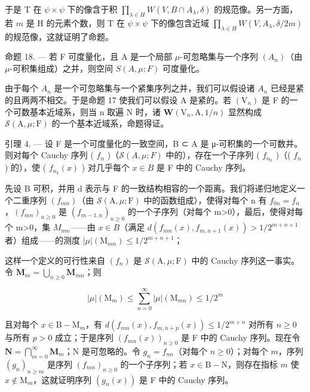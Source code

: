 于是 T 在 \(\psi \times \psi\) 下的像含于积 \(\prod_{\lambda \in H} W(V, B \cap A_{\lambda}, \delta)\) 的规范像。另一方面，若 \(m\) 是 H 的元素个数，则 T 在 \(\psi \times \psi\) 下的像包含近域 \(\prod_{\lambda \in H} W(V, A_{\lambda}, \delta / 2m)\) 的规范像，这就证明了命题。

命题 18. --- 若 F 可度量化，且 A 是一个局部 \(\mu\)-可忽略集与一个序列 \((A_{n})\)（由 \(\mu\)-可积集组成）之并，则空间 \(S(A,\mu;F)\) 可度量化。

由于每个 \(A_{n}\) 是一个可忽略集与一个紧集序列之并，我们可以假设诸 \(A_{n}\) 已经是紧的且两两不相交。于是命题 17 使我们可以假设 A 是紧的。若 \((\mathrm{V}_{n})\) 是 F 的一个可数基本近域系，则当 n 取遍 N 时，诸 \(\boldsymbol{W}(\mathrm{V}_{n},\mathrm{A},1/n)\) 显然构成 \(\mathcal{S}(\mathrm{A},\mu;\mathrm{F})\) 的一个基本近域系，命题得证。

引理 4. --- 设 F 是一个可度量化的一致空间，B ⊂ A 是 μ-可积集的一个可数并。则对每个 Cauchy 序列 ( \(f_{n}\) )（\(\mathcal{S}(A,\mu;F)\) 中的），存在一个子序列 ( \(f_{n_{k}}\) )（( \(f_{n}\) ) 的），使 ( \(f_{n_{k}}(x)\) ) 对几乎每个 \(x \in B\) 是 F 中的 Cauchy 序列。

先设 B 可积，并用 d 表示与 F 的一致结构相容的一个距离。我们将递归地定义一个二重序列 \((f_{mn})\)（由 \(\mathcal{S}(\mathrm{A},\mu;\mathrm{F})\) 中的函数组成），使得对每个 n 有 \(f_{0n}=f_{n}\)，\((f_{mn})_{n\geqslant0}\) 是 \((f_{m-1,n})_{n\geqslant0}\) 的一个子序列（对每个 m\textgreater0），最后，使得对每个 m\textgreater0，集 \(M_{mn}\)——由 \(x\in B\)（满足 \(d(f_{mn}(x),f_{m,n+1}(x))>1/2^{m+n+1}\) 者）组成——的测度 \(|\mu|(\mathrm{M}_{mn})\leqslant1/2^{m+n+1}\)；

这样一个定义的可行性来自 \((f_n)\) 是 \(\mathcal{S}(\mathrm{A},\mu ;\mathrm{F})\) 中的 Cauchy 序列这一事实。令 \(\mathbf{M}_m = \bigcup_{n\geqslant 0}\mathbf{M}_{mn}\)；则

\[
| \mu | (\mathrm{M} _ {m}) \leqslant \sum_ {n = 0} ^ {\infty} | \mu | (\mathrm{M} _ {m n}) \leqslant 1 / 2 ^ {m}
\]

且对每个 \(x \in \mathrm{B} - \mathrm{M}_m\)，有 \(d(f_{mn}(x), f_{m,n+p}(x)) \leqslant 1/2^{m+n}\) 对所有 \(n \geqslant 0\) 与所有 \(p > 0\) 成立；于是序列 \((f_{mn}(x))_{n \geqslant 0}\) 是 F 中的 Cauchy 序列。现在令 \(\mathbf{N} = \bigcap_{m=0}^{\infty} \mathbf{M}_m\)；N 是可忽略的。令 \(g_n = f_{nn}\)（对每个 \(n \geqslant 0\)）；对每个 \(m\)，序列 \((g_n)_{n \geqslant m}\) 是序列 \((f_{mn})_{n \geqslant 0}\) 的一个子序列；若 \(x \in \mathrm{B} - \mathrm{N}\)，则存在指标 \(m\) 使 \(x \notin \mathrm{M}_m\)，这就证明序列 \((g_n(x))\) 是 F 中的 Cauchy 序列。

